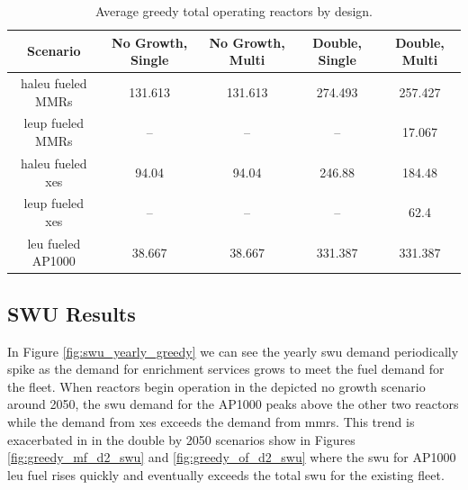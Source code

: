 \begin{table}[H]
  \centering
  \caption{Average greedy total operating reactors by design.}
  \label{tab:greedy_reac_avg}
  \begin{tabular}{c c c c c}
     \hline
     Scenario & No Growth, Single & No Growth, Multi & Double, Single & Double, Multi  \\
     \hline
     \gls{haleu} fueled MMRs      & 131.613 & 131.613 & 274.493 & 257.427 \\
     \gls{leup} fueled MMRs       & --      & --      & --      & 17.067 \\
     \gls{haleu} fueled \gls{xe}s & 94.04   & 94.04   & 246.88  & 184.48 \\
     \gls{leup} fueled \gls{xe}s  & --      & --      & --      & 62.4 \\
     \gls{leu} fueled AP1000      & 38.667  & 38.667  & 331.387 & 331.387 \\
     \hline
  \end{tabular}
\end{table}




\subsection{SWU Results}
\label{sec:greedy_swu}

In Figure \ref{fig:swu_yearly_greedy} we can see the yearly \gls{swu} demand periodically spike as the demand for enrichment services grows to meet the fuel demand for the fleet. When reactors begin operation in the depicted no growth scenario around 2050, the \gls{swu} demand for the AP1000 peaks above the other two reactors while the demand from \glspl{xe} exceeds the demand from \glspl{mmr}. This trend is exacerbated in in the double by 2050 scenarios show in Figures \ref{fig:greedy_mf_d2_swu} and \ref{fig:greedy_of_d2_swu} where the \gls{swu} for AP1000 \gls{leu} fuel rises quickly and eventually exceeds the total \gls{swu} for the existing fleet.



